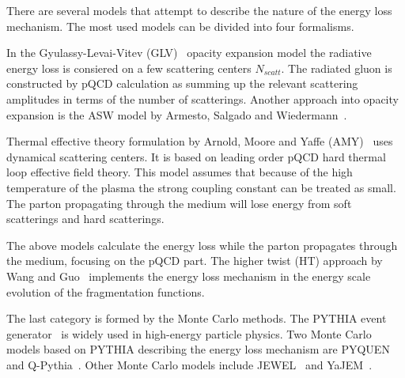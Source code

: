 There are several models that attempt to describe the nature of the energy loss mechanism. The most used models can be divided into four formalisms.
%

In the Gyulassy-Levai-Vitev (GLV)~\cite{Gyulassy:1999zd} opacity expansion model
 the radiative energy loss is consiered on a few scattering centers $N_{scatt}$. The radiated gluon is constructed by pQCD calculation as summing up the relevant scattering amplitudes in terms of the number of scatterings. Another approach into opacity expansion is the ASW model by Armesto, Salgado and Wiedermann~\cite{Wiedemann:2000za}.

Thermal effective theory formulation by Arnold, Moore and Yaffe (AMY)~\cite{Arnold:2001ms} uses dynamical scattering centers. It is based on leading order pQCD hard thermal loop effective field theory. This model assumes that because of the high temperature of the plasma the strong coupling constant can be treated as small. The parton propagating through the medium will lose energy from soft scatterings and hard scatterings.

The above models calculate the energy loss while the parton propagates through the medium, focusing on the pQCD part. The higher twist (HT) approach by Wang and Guo~\cite{Wang:2001ifa} implements the energy loss mechanism in the energy scale evolution of the fragmentation functions.

The last category is formed by the Monte Carlo methods. The PYTHIA event generator~\cite{pythia} is widely used in high-energy particle physics. Two Monte Carlo models based on PYTHIA describing the energy loss mechanism are PYQUEN~\cite{Lokhtin:2005px} and Q-Pythia~\cite{Armesto:2009zc}. Other Monte Carlo models include JEWEL~\cite{Zapp:2008gi} and YaJEM~\cite{Renk:2009nz}. 



